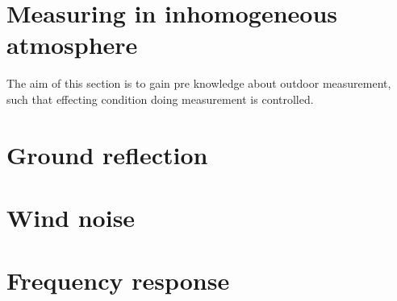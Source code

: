 \section{Measuring in inhomogeneous atmosphere}
The aim of this section is to gain pre knowledge about outdoor measurement, such that effecting condition doing measurement is controlled. 

\section{Ground reflection}

\section{Wind noise}

\section{Frequency response}

 